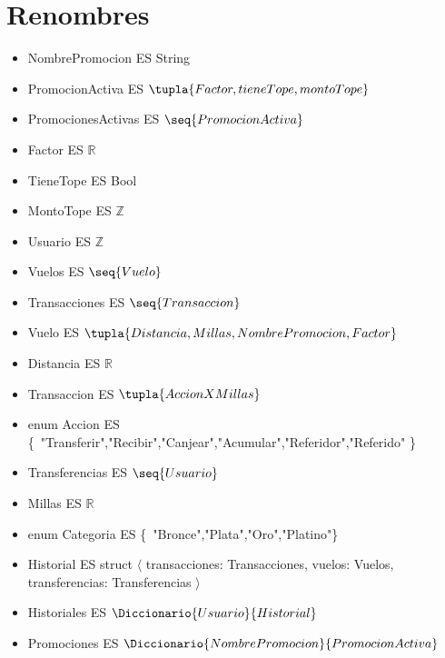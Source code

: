 \documentclass[11pt,a4paper]{article}
\begin{document}
\maketitle

\section{Renombres}

\begin{itemize}
    \item[]NombrePromocion ES String
    \item[]PromocionActiva ES $\tupla{Factor, tieneTope, montoTope}$
    \item[]PromocionesActivas ES $\seq{PromocionActiva}$
    \item[]Factor ES $\mathbb{R}$ 
    \item[]TieneTope ES Bool
    \item[]MontoTope ES $\mathbb{Z}$    
    \item[]Usuario ES $\mathbb{Z}$  
    \item[]Vuelos ES $\seq{Vuelo}$
    \item[]Transacciones ES $\seq{Transaccion}$
    \item[]Vuelo ES $\tupla{Distancia,Millas,NombrePromocion,Factor}$
    \item[]Distancia ES $\mathbb{R}$
    \item[]Transaccion ES $\tupla{Accion X Millas}$
    \item[]enum Accion ES \{\ "Transferir","Recibir","Canjear","Acumular","Referidor","Referido" \}\ 
    \item[]Transferencias ES $\seq{Usuario}$
    \item[]Millas ES $\mathbb{R}$     
    \item[]enum Categoria ES \{\ "Bronce","Plata","Oro","Platino"\}\
    \item[]Historial ES struct $\langle$ transacciones: Transacciones, vuelos: Vuelos, transferencias: Transferencias $\rangle$
    \item[] Historiales ES $\Diccionario{Usuario}{Historial}$
    \item[] Promociones ES $\Diccionario{NombrePromocion}{PromocionActiva}$
    
\end{itemize}
\end{document}
